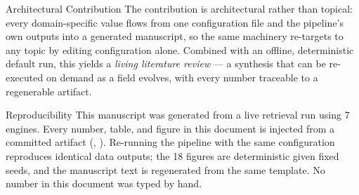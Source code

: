 \documentclass[
  ignorenonframetext,
]{beamer}
\begin{document}
\begin{frame}[allowframebreaks]{Architectural Contribution}
\protect{}\label{architectural-contribution}
The contribution is architectural rather than topical: every
domain-specific value flows from one configuration file and the
pipeline's own outputs into a generated manuscript, so the same
machinery re-targets to any topic by editing configuration alone.
Combined with an offline, deterministic default run, this yields a
\emph{living literature review} --- a synthesis that can be re-executed
on demand as a field evolves, with every number traceable to a
regenerable artifact.
\end{frame}

\begin{frame}{Reproducibility}
\protect{}\label{reproducibility}
This manuscript was generated from a live retrieval run using 7 engines.
Every number, table, and figure in this document is injected from a
committed artifact (,
). Re-running the pipeline with the same
configuration reproduces identical data outputs; the 18 figures are
deterministic given fixed seeds, and the manuscript text is regenerated
from the same template. No number in this document was typed by hand.
\end{frame}
\end{document}
